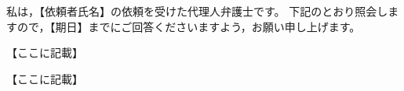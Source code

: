 \documentclass{ltjsarticle}
\begin{document}
\maketitle


私は，【依頼者氏名】の依頼を受けた代理人弁護士です。
下記のとおり照会しますので，【期日】までにご回答くださいますよう，お願い申し上げます。


\vspace{1\zw}



\SecB{}

【ここに記載】

\SecB{}

【ここに記載】









\Ijo[2\zw]
\end{document}
